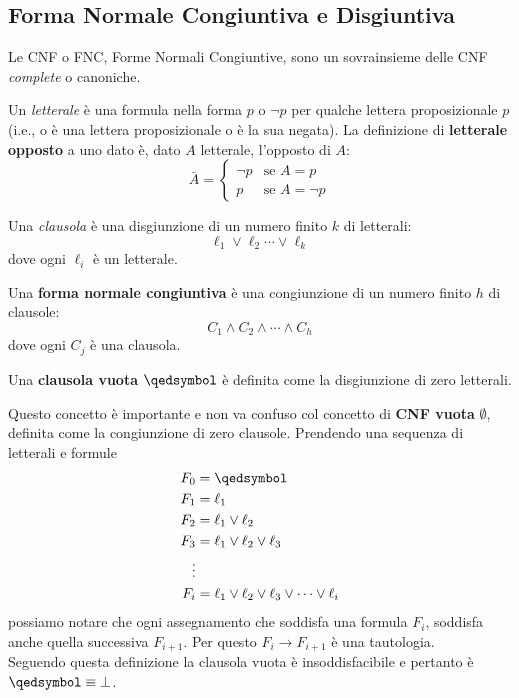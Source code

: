 \subsection{Forma Normale Congiuntiva e Disgiuntiva}
Le CNF o FNC, Forme Normali Congiuntive, sono un sovrainsieme delle CNF \textit{complete} o canoniche.
\begin{defi}[Letterale]
Un \textit{letterale} è una formula nella forma $p$ o $\neg p$ per qualche lettera proposizionale $p$ (i.e., o è una lettera proposizionale o è la sua negata).
La definizione di \textbf{letterale opposto} a uno dato è, dato $A$ letterale, l'opposto di $A$:
$$
\bar{A} = 
\begin{cases}
  \neg p & \text{se } A = p \\
  p & \text{se } A = \neg p
\end{cases}
$$
\end{defi}
\begin{defi}[Clausola]
Una \textit{clausola} è una disgiunzione di un numero finito $k$ di letterali:
$$
\ell_1 \lor \ell_2 \cdots \lor \ell_k
$$
dove ogni $\ell_i$ è un letterale. 
\end{defi}
\begin{defi}
Una \textbf{forma normale congiuntiva} è una congiunzione di un numero finito $h$ di 
clausole: 
$$
C_1 \land C_2 \land \cdots \land C_h
$$
dove ogni $C_j$ è una clausola. 
\end{defi}
\begin{defi}
Una \textbf{clausola vuota} $\qedsymbol$ è definita come la disgiunzione 
di zero letterali. 
\end{defi}

Questo concetto è importante e non va confuso col concetto 
di \textbf{CNF vuota} $\emptyset$, definita come la congiunzione di zero clausole. 
Prendendo una sequenza di letterali e formule
\begin{align*}
F_0 & = \qedsymbol \\
F_1 & = \ell_1 \\
F_2 & = \ell_1 \lor \ell_2 \\
F_3 & = \ell_1 \lor \ell_2 \lor \ell_3 \\
\vdots \\
F_i & = \ell_1 \lor \ell_2 \lor \ell_3 \lor \cdots \lor \ell_i
\end{align*}
possiamo notare che ogni assegnamento che soddisfa una formula $F_i$, soddisfa anche quella successiva $F_{i+1}$. Per questo $F_i \rightarrow F_{i+1}$ è una tautologia. \\
Seguendo questa definizione la clausola vuota è insoddisfacibile e pertanto è $\qedsymbol \equiv \bot$.

